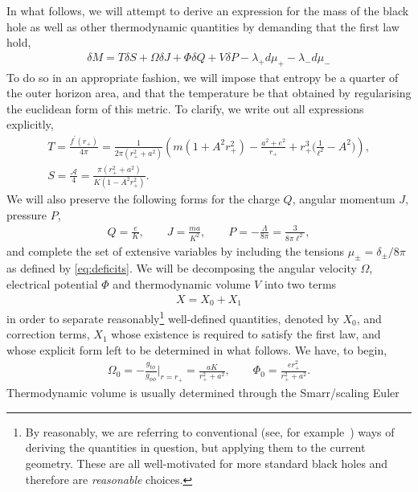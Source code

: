 \documentclass[
twoside,openright,frontopenright]{dmathesis}
\newcommand{\nn}{\nonumber}
\newcommand{\todoopt}[2][]{\todo[color=blue!20,size=\footnotesize,#1]{#2}}
\begin{document}
In what follows, we will attempt to derive an expression for the mass of the
black hole as well as other thermodynamic quantities by demanding that the first
law hold,
\begin{align}\label{eq:fullFLT}
\delta M = T\delta S + \Omega \delta J + \Phi \delta Q + V \delta P  - \lambda_+ d\mu_+ - \lambda_- d\mu_-
\end{align}
To do so in an appropriate fashion, we will impose that entropy be a quarter of
the outer horizon area, and that the temperature be that obtained by
regularising the euclidean form of this metric. To clarify, we write out all
expressions explicitly, 
\begin{gather}
T= \frac{f^\prime (r_+)}{4\pi} = \frac{1}{2\pi(r_+^2+a^2)}\left(m(1+A^2 r_+^2)-\frac{a^2+e^2}{r_+}+r_+^3\Big(\frac{1}{\ell^2}-A^2\Big)\right), \nn\\
S = \frac{\mathcal{A}}{4} = \frac{\pi(r_+^2+a^2)}{K(1-A^2 r_+^2)}.
\label{eq:TS}
\end{gather}
We will also preserve the following forms for the charge $Q$, angular momentum $J$, pressure $P$,
\begin{gather}\label{eq:QJP}
Q=\frac{e}{K}, \qquad J = \frac{m a}{K^2}, \qquad P = -\frac{\Lambda}{8\pi} = \frac{3}{8\pi \ell^2},
\end{gather}
and complete the set of extensive variables by including the tensions
$\mu_\pm=\delta_\pm/8\pi$ as defined by \cref{eq:deficits}. We will be
decomposing the angular velocity $\Omega$, electrical potential $\Phi$ and
thermodynamic volume $V$ into two terms
\begin{align}\label{eq:X}
X=X_0+X_1
\end{align}
in order to separate reasonably\footnote{By reasonably, we are referring to
  conventional (see, for example~\cite{Gibbons:2004ai}) ways of deriving the
  quantities in question, but applying them to the current geometry. These are
  all well-motivated for more standard black holes and therefore are
  \emph{reasonable} choices.} well-defined quantities, denoted by $X_0$, and
correction terms, $X_1$ whose existence is required to satisfy the first law,
and whose explicit form left to be determined in what follows. We have, to
begin,\todoopt{expression for $\Phi_0$?}
\begin{gather}\label{eq:OP0}
\Omega_0 = -\frac{g_{t\phi}}{g_{\phi\phi}}\bigg|_{r=r_+} = \frac{a
  K}{r_+^2+a^2}, \qquad \Phi_0 = \frac{e r_+^2}{r_+^2+a^2}. 
\end{gather}
Thermodynamic volume is usually determined through the Smarr/scaling Euler
\end{document}
